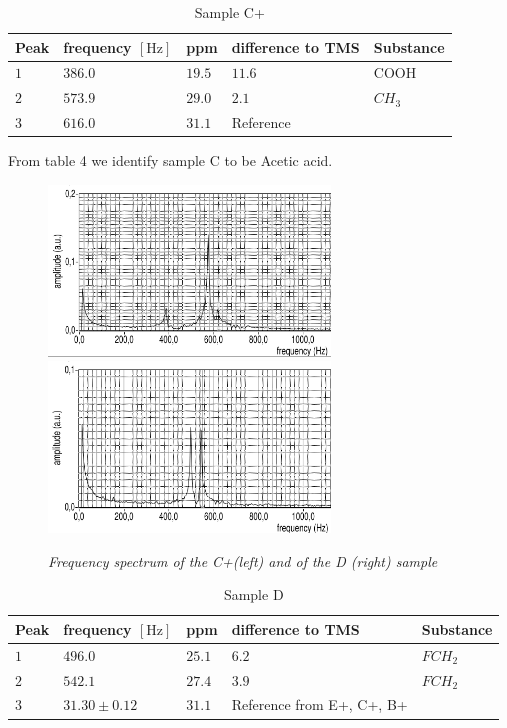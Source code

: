 \begin{table}[h]
	\centering
	\begin{tabular}{lllll}
		\toprule
		Peak & frequency $\left[\mathrm{Hz}\right]$ & ppm & difference to TMS & Substance \\
		\midrule
		$ 1$ & $386.0$ & $19.5$ & $11.6$ & COOH\\
		
		$ 2$ & $573.9$ & $29.0$ &$ 2.1$ & $CH_3$\\
		
		$ 3$ & $616.0$ &$31.1$ & Reference & \\
		\bottomrule
	\end{tabular}
	\caption{Sample C+}
	\label{tab:4}
\end{table}
\noindent

From table 4 we identify sample C to be Acetic acid.

\begin{figure}[h]
	\centering
	\includegraphics[width=75mm]{C+}
	\includegraphics[width=75mm]{D}
	\caption{\itshape Frequency spectrum of the C+(left) and of the D (right) sample}
	\label{fig:8}
\end{figure}
\noindent
\begin{table}[h!]
	\centering
	\begin{tabular}{lllll}
		\toprule
		Peak & frequency $\left[\mathrm{Hz}\right]$ & ppm & difference to TMS & Substance \\
		\midrule
		$ 1$ & $496.0$ & $25.1$ & $6.2$ & $FCH_2$\\
		
		$ 2$ & $ 542.1$ & $27.4$ &$ 3.9$ & $FCH_2$\\
		
		$ 3$ & $31.30 \pm 0.12$ &$31.1$ & Reference from E+, C+, B+ & \\
		\bottomrule
	\end{tabular}
	\caption{Sample D}
	\label{tab:5}
\end{table}

